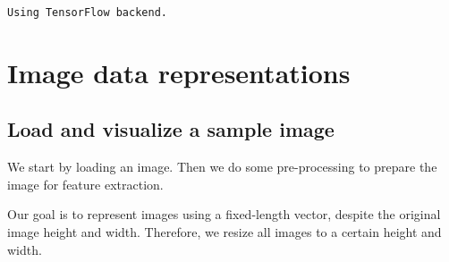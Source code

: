 \documentclass[11pt]{article}
\begin{document}
    \begin{Verbatim}[commandchars=\\\{\}]
Using TensorFlow backend.

    \end{Verbatim}

    \hypertarget{image-data-representations}{%
\section{ Image data representations}\label{image-data-representations}}

\hypertarget{load-and-visualize-a-sample-image}{%
\subsection{ Load and visualize a sample
image}\label{load-and-visualize-a-sample-image}}

We start by loading an image. Then we do some pre-processing to prepare
the image for feature extraction.

Our goal is to represent images using a fixed-length vector, despite the
original image height and width. Therefore, we resize all images to a
certain height and width.
\end{document}
